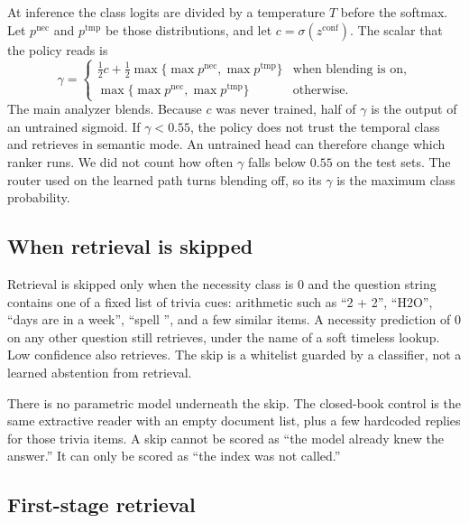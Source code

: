 \documentclass[11pt,letterpaper]{article}
\begin{document}
At inference the class logits are divided by a temperature $T$ before the softmax.
Let $p^{\mathrm{nec}}$ and $p^{\mathrm{tmp}}$ be those distributions, and let $c=\sigma(z^{\mathrm{conf}})$.
The scalar that the policy reads is
\begin{equation}
\gamma =
\begin{cases}
\tfrac12 c + \tfrac12 \max\{\max p^{\mathrm{nec}}, \max p^{\mathrm{tmp}}\}
& \text{when blending is on,}\\[0.3em]
\max\{\max p^{\mathrm{nec}}, \max p^{\mathrm{tmp}}\}
& \text{otherwise.}
\end{cases}
\label{eq:conf}
\end{equation}
The main analyzer blends.
Because $c$ was never trained, half of $\gamma$ is the output of an untrained sigmoid.
If $\gamma < 0.55$, the policy does not trust the temporal class and retrieves in semantic mode.
An untrained head can therefore change which ranker runs.
We did not count how often $\gamma$ falls below $0.55$ on the test sets.
The router used on the learned path turns blending off, so its $\gamma$ is the maximum class probability.

\subsection{When retrieval is skipped}
\label{sec:when}

Retrieval is skipped only when the necessity class is $0$ and the question string contains one of a fixed list of trivia cues: arithmetic such as ``2 + 2'', ``H2O'', ``days are in a week'', ``spell '', and a few similar items.
A necessity prediction of $0$ on any other question still retrieves, under the name of a soft timeless lookup.
Low confidence also retrieves.
The skip is a whitelist guarded by a classifier, not a learned abstention from retrieval.

There is no parametric model underneath the skip.
The closed-book control is the same extractive reader with an empty document list, plus a few hardcoded replies for those trivia items.
A skip cannot be scored as ``the model already knew the answer.''
It can only be scored as ``the index was not called.''

\subsection{First-stage retrieval}
\end{document}
